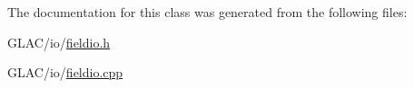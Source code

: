 The documentation for this class was generated from the following files\+:\begin{DoxyCompactItemize}
\item 
G\+L\+A\+C/io/\mbox{\hyperlink{fieldio_8h}{fieldio.\+h}}\item 
G\+L\+A\+C/io/\mbox{\hyperlink{fieldio_8cpp}{fieldio.\+cpp}}\end{DoxyCompactItemize}
